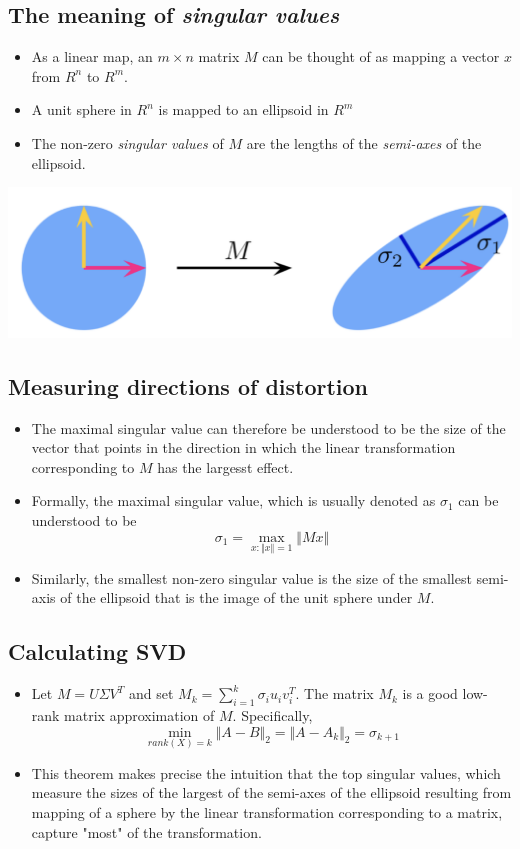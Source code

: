 \documentclass[10pt]{article}
\begin{document}
\subsection*{The meaning of \textit{singular values}}
\begin{itemize}
    \item As a linear map, an $m \times n$ matrix $M$ can be thought of as mapping a vector $x$ from $R^n$ to $R^m$.
    \item A unit sphere in $R^n$ is mapped to an ellipsoid in $R^m$
    \item The non-zero \textit{singular values} of $M$ are the lengths of the \textit{semi-axes} of the ellipsoid.
\end{itemize}
\begin{center}
    \includegraphics*[scale=0.5]{W8_1.png}
\end{center}

\subsection*{Measuring directions of distortion}
\begin{itemize}
    \item The maximal singular value can therefore be understood to be the size of the vector that points in the direction in which the linear transformation corresponding to $M$ has the largesst effect.
    \item Formally, the maximal singular value, which is usually denoted as $\sigma_1$ can be understood to be 
    \[\sigma_1 = \max_{x:\Vert x \Vert = 1} \Vert Mx\Vert\]
    \item Similarly, the smallest non-zero singular value is the size of the smallest semi-axis of the ellipsoid that is the image of the unit sphere under $M$.
\end{itemize}

\subsection*{Calculating SVD}
\begin{itemize}
    \item Let $M = U\Sigma V^T$ and set $M_k = \sum_{i = 1}^k \sigma_i u_i v_i^T$.  The matrix $M_k$ is a good low-rank matrix approximation of $M$.  Specifically,
    \[\min_{rank(X) = k} \Vert A - B \Vert_2 = \Vert A - A_k \Vert_2 = \sigma_{k + 1}\]
    \item This theorem makes precise the intuition that the top singular values, which measure the sizes of the largest of the semi-axes of the ellipsoid resulting from mapping of a sphere by the linear transformation corresponding to a matrix, capture "most" of the transformation.
\end{itemize}
\end{document}
